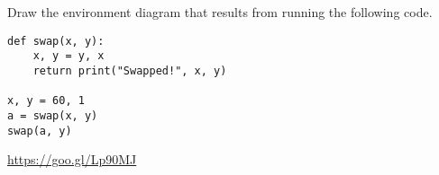 \question Draw the environment diagram that results from running the following code.

\begin{lstlisting}
def swap(x, y):
    x, y = y, x
    return print("Swapped!", x, y)

x, y = 60, 1
a = swap(x, y)
swap(a, y)
\end{lstlisting}

\begin{solution}[2in]
\url{https://goo.gl/Lp90MJ}
\end{solution}